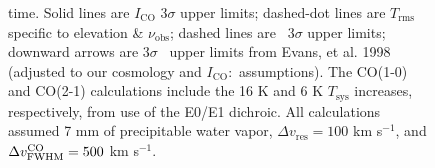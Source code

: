 \documentclass[11pt]{article}
\begin{document}
\begin{figure}[htp]
\begin{center}
{      time. Solid lines are $I_{\mathrm{CO}}$ $3\sigma$ upper limits;
      dashed-dot lines are $T_{\mathrm{rms}}$ specific to elevation \&
      $\nu_{\mathrm{obs}}$; dashed lines are \mht\ $3\sigma$ upper
      limits; downward arrows are $3\sigma$ \mht\ upper limits from
      Evans, et al. 1998 (adjusted to our cosmology and
      $I_{\mathrm{CO}}$:\mht\ assumptions). The CO(1-0) and CO(2-1)
      calculations include the 16 K and 6 K $T_{\mathrm{sys}}$
      increases, respectively, from use of the E0/E1 dichroic. All
      calculations assumed 7 mm of precipitable water vapor, $\Delta
      v_{\mathrm{res}} = 100$ km s$^{-1}$, and $\Delta v^{\mathrm{CO}}_{\mathrm{FWHM}} = 500$ km
      s$^{-1}$.}
    \label{fig:feas}
  \end{center}
\end{figure}

\end{document}
